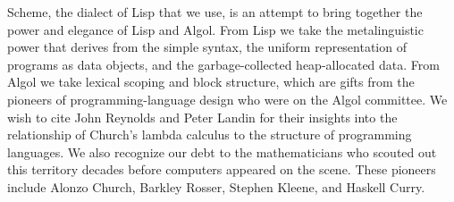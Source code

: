 Scheme, the dialect of Lisp that we use, is an attempt to bring
together the power and elegance of Lisp and Algol.  From Lisp we take
the metalinguistic power that derives from the simple syntax, the
uniform representation of programs as data objects, and the
garbage-collected heap-allocated data.  From Algol we take lexical
scoping and block structure, which are gifts from the pioneers of
programming-language design who were on the Algol committee.  We wish
to cite John Reynolds and Peter Landin for their insights into the
relationship of Church's lambda calculus to the structure of
programming languages.  We also recognize our debt to the
mathematicians who scouted out this territory decades before computers
appeared on the scene.  These pioneers include Alonzo Church, Barkley
Rosser, Stephen Kleene, and Haskell Curry.

